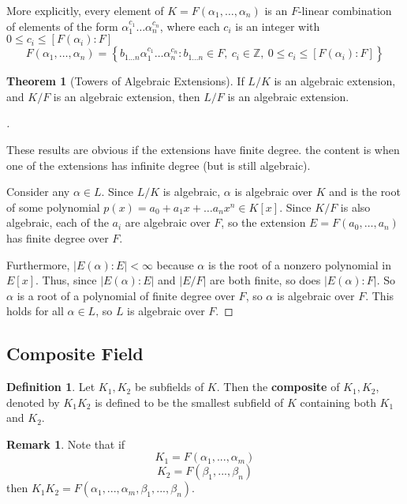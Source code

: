 \documentclass[12pt]{article}
\theoremstyle{definition}
\newtheorem{thm}{Theorem}
\newtheorem{dfn}{Definition}
\newtheorem{rem}{Remark}
\newenvironment{proofs}[1][\proofname]{%
  \begin{proof}[#1]$ $\par\nobreak\ignorespaces
}{%
  \end{proof}
}
\newcommand{\ZZ}{\mathbb Z}
\begin{document}
More explicitly, every element of $K=F(\alpha_1,\dots,\alpha_n)$ is an $F$-linear combination of elements of the form $\alpha_1^{c_1}\dots\alpha_n^{c_n}$, where each $c_i$ is an integer with $0\le c_i\le[F(\alpha_i):F]$
\[
	F(\alpha_1,\dots,\alpha_n)=\left\{
	b_{1\dots n}\alpha_1^{c_1}\dots\alpha_n^{c_n}:
	b_{1\dots n}\in F,\ c_i\in\ZZ,\ 0\le c_i\le[F(\alpha_i):F]
	\right\}
\]

\begin{thm}[Towers of Algebraic Extensions]
	If $L/K$ is an algebraic extension, and $K/F$ is an algebraic
	extension, then $L/F$ is an algebraic extension.
\end{thm}

\begin{proofs}
	These results are obvious if the extensions have finite degree. the
	content is when one of the extensions has infinite degree (but is
	still algebraic).

	Consider any $\alpha\in L$. Since $L/K$ is algebraic, $\alpha$ is algebraic over $K$ and is the root of some polynomial $p(x)=a_0+a_1x+\dots a_n x^n\in K[x]$. Since $K/F$ is also algebraic, each of the $a_i$ are algebraic over $F$, so the extension $E=F(a_0,\dots,a_n)$ has finite degree over $F$.

	Furthermore, $|E(\alpha):E|<\infty$ because $\alpha$ is the root of a nonzero polynomial in $E[x]$. Thus, since $|E(\alpha):E|$ and $|E/F|$ are both finite, so does $|E(\alpha):F|$. So $\alpha$ is a root of a polynomial of finite degree over $F$, so $\alpha$ is algebraic over $F$. This holds for all $\alpha\in L$, so $L$ is algebraic over $F$.
\end{proofs}

\subsection{Composite Field}

\begin{dfn}
	Let $K_1, K_2$ be subfields of $K$.
	Then the \textbf{composite} of $K_1, K_2$, denoted by $K_1 K_2$ is defined to be the smallest subfield of $K$ containing both $K_1$ and $K_2$.
\end{dfn}

\begin{rem}
	Note that if
	\[
		K_1 = F(\alpha_1, ..., \alpha_m)
	\]
	\[
		K_2 = F(\beta_1, ..., \beta_n)
	\]
	then $K_1K_2 = F(\alpha_1, ..., \alpha_m, \beta_1, ..., \beta_n)$.
\end{rem}
\end{document}
